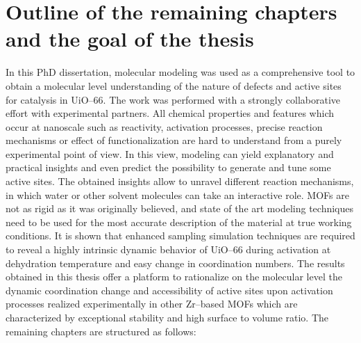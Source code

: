 \section[Outline and the goal of the thesis]{Outline of the remaining chapters
and the goal of the thesis} 
In this PhD dissertation, molecular modeling was used as a comprehensive tool to
obtain a molecular level understanding of the nature of defects and active sites
for catalysis in UiO--66.
The work was performed with a strongly collaborative effort with experimental
partners. All chemical properties and features which occur at nanoscale such as
reactivity, activation processes, precise reaction mechanisms or effect of
functionalization are hard to understand from a purely experimental point of view. In this view, modeling can yield explanatory and practical insights
and even predict the possibility to generate and tune some active sites.
The obtained insights allow to unravel different reaction mechanisms, in which
water or other solvent molecules can take an interactive role.  MOFs are not as rigid as it was originally believed, and
state of the art modeling techniques need to be used for the most accurate 
description of the material at true working conditions. It is shown that
enhanced sampling simulation techniques are required to reveal a highly
intrinsic dynamic behavior of UiO--66 during activation at dehydration
temperature and easy change in coordination numbers.
The results obtained in this thesis offer a platform to rationalize on the
molecular level the dynamic coordination change and accessibility of active sites upon activation processes realized experimentally in other Zr--based MOFs which are characterized by exceptional stability and high surface to volume ratio.
\npar
\noindent
The remaining chapters are structured as follows:
